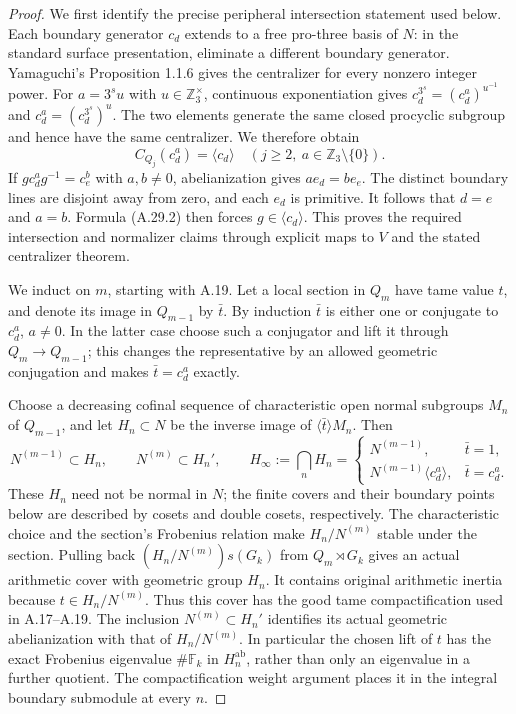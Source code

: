 \begin{proof}
We first identify the precise peripheral
intersection statement used below.
Each boundary generator $c_d$ extends
to a free pro-three basis of $N$:
in the standard surface presentation,
eliminate a different boundary generator.
Yamaguchi's Proposition 1.1.6
\cite{AYamaguchi2023} gives the centralizer
for every nonzero integer power. For
$a=3^s u$ with $u\in\mathbb Z_3^\times$,
continuous exponentiation gives
$c_d^{3^s}=(c_d^a)^{u^{-1}}$ and
$c_d^a=(c_d^{3^s})^u$. The two elements
generate the same closed procyclic
subgroup and hence have the same
centralizer. We therefore obtain
\[
 C_{Q_j}(c_d^a)=\langle c_d\rangle
       \quad(j\ge2,\ a\in\mathbb Z_3\setminus\{0\}).
 \tag{A.29.2}
\]
If $g c_d^a g^{-1}=c_e^b$ with $a,b\ne0$,
abelianization gives $a e_d=b e_e$.
The distinct boundary lines are disjoint
away from zero, and each $e_d$ is primitive.
It follows that $d=e$ and $a=b$.
Formula (A.29.2) then forces
$g\in\langle c_d\rangle$. This proves
the required intersection and normalizer
claims through explicit maps to $V$ and
the stated centralizer theorem.

We induct on $m$, starting with A.19.
Let a local section in $Q_m$ have tame
value $t$, and denote its image in
$Q_{m-1}$ by $\bar t$. By induction
$\bar t$ is either one or conjugate
to $c_d^a$, $a\ne0$. In the latter case
choose such a conjugator and lift it
through $Q_m\to Q_{m-1}$; this changes
the representative by an allowed
geometric conjugation and makes
$\bar t=c_d^a$ exactly.

Choose a decreasing cofinal sequence
of characteristic open normal subgroups
$M_n$ of $Q_{m-1}$, and let $H_n\subset N$
be the inverse image of
$\langle\bar t\rangle M_n$. Then
\[
 N^{(m-1)}\subset H_n,
 \qquad N^{(m)}\subset H_n',
 \qquad
 H_\infty:=\bigcap_nH_n
      =\begin{cases}
         N^{(m-1)},&\bar t=1,\\
         N^{(m-1)}\langle c_d^a\rangle,&\bar t=c_d^a.
        \end{cases}
 \tag{A.29.3}
\]
These $H_n$ need not be normal in $N$;
the finite covers and their boundary
points below are described by cosets
and double cosets, respectively.
The characteristic choice and the
section's Frobenius relation make
$H_n/N^{(m)}$ stable under the section.
Pulling back
$(H_n/N^{(m)})s(G_k)$ from
$Q_m\rtimes G_k$ gives an actual
arithmetic cover with geometric group
$H_n$. It contains original arithmetic
inertia because $t\in H_n/N^{(m)}$.
Thus this cover has the good tame
compactification used in A.17--A.19.
The inclusion $N^{(m)}\subset H_n'$
identifies its actual geometric
abelianization with that of
$H_n/N^{(m)}$. In particular the
chosen lift of $t$ has the exact
Frobenius eigenvalue $\#\mathbb F_k$
in $H_n^{\mathrm{ab}}$, rather than
only an eigenvalue in a further quotient.
The compactification weight argument
places it in the integral boundary
submodule at every $n$.


\end{proof}
